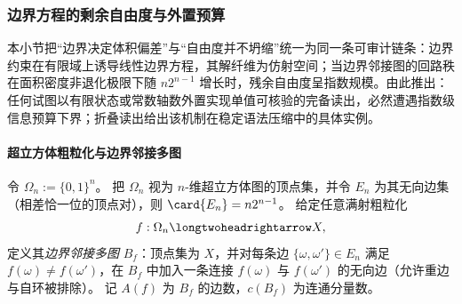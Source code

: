 
\subsubsection{边界方程的剩余自由度与外置预算}\label{subsubsec:spg-boundary-affine-residual-freedom}
本小节把“边界决定体积偏差”与“自由度并不坍缩”统一为同一条可审计链条：边界约束在有限域上诱导线性边界方程，其解纤维为仿射空间；当边界邻接图的回路秩在面积密度非退化极限下随 \(n2^{n-1}\) 增长时，残余自由度呈指数规模。由此推出：任何试图以有限状态或常数轴数外置实现单值可核验的完备读出，必然遭遇指数级信息预算下界；折叠读出给出该机制在稳定语法压缩中的具体实例。

\paragraph{超立方体粗粒化与边界邻接多图}
令 \(\Omega_n:=\{0,1\}^n\)。
把 \(\Omega_n\) 视为 \(n\)-维超立方体图的顶点集，并令 \(E_n\) 为其无向边集（相差恰一位的顶点对），则 \(\card{E_n}=n2^{n-1}\)。
给定任意满射粗粒化
\[
f:\Omega_n\longtwoheadrightarrow X,
\]
定义其\emph{边界邻接多图} \(B_f\)：顶点集为 \(X\)，并对每条边 \(\{\omega,\omega'\}\in E_n\) 满足 \(f(\omega)\neq f(\omega')\)，在 \(B_f\) 中加入一条连接 \(f(\omega)\) 与 \(f(\omega')\) 的无向边（允许重边与自环被排除）。
记 \(A(f)\) 为 \(B_f\) 的边数，\(c(B_f)\) 为连通分量数。



